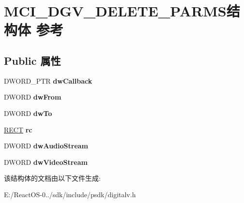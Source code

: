 \hypertarget{struct_m_c_i___d_g_v___d_e_l_e_t_e___p_a_r_m_s}{}\section{M\+C\+I\+\_\+\+D\+G\+V\+\_\+\+D\+E\+L\+E\+T\+E\+\_\+\+P\+A\+R\+M\+S结构体 参考}
\label{struct_m_c_i___d_g_v___d_e_l_e_t_e___p_a_r_m_s}
\subsection*{Public 属性}
\begin{DoxyCompactItemize}
\item 
\mbox{\label{struct_m_c_i___d_g_v___d_e_l_e_t_e___p_a_r_m_s_a3f08d20ea19a0c601505636c8ce9ef38}} 
D\+W\+O\+R\+D\+\_\+\+P\+TR {\bfseries dw\+Callback}
\item 
\mbox{\label{struct_m_c_i___d_g_v___d_e_l_e_t_e___p_a_r_m_s_a28b40a05c4c8c87f0035c87f5d67fc40}} 
D\+W\+O\+RD {\bfseries dw\+From}
\item 
\mbox{\label{struct_m_c_i___d_g_v___d_e_l_e_t_e___p_a_r_m_s_afd8b0897dedf6e36043d8112009fc9ce}} 
D\+W\+O\+RD {\bfseries dw\+To}
\item 
\mbox{\label{struct_m_c_i___d_g_v___d_e_l_e_t_e___p_a_r_m_s_a9edaf53cf5c19d4d1438baf17c58153d}} 
\hyperlink{structtag_r_e_c_t}{R\+E\+CT} {\bfseries rc}
\item 
\mbox{\label{struct_m_c_i___d_g_v___d_e_l_e_t_e___p_a_r_m_s_a98b0a12334a1b9d4eab3d47a8ee0f74d}} 
D\+W\+O\+RD {\bfseries dw\+Audio\+Stream}
\item 
\mbox{\label{struct_m_c_i___d_g_v___d_e_l_e_t_e___p_a_r_m_s_aaa9e86b9fc4947678d01345ae057cb1d}} 
D\+W\+O\+RD {\bfseries dw\+Video\+Stream}
\end{DoxyCompactItemize}


该结构体的文档由以下文件生成\+:\begin{DoxyCompactItemize}
\item 
E\+:/\+React\+O\+S-\/0../sdk/include/psdk/digitalv.\+h\end{DoxyCompactItemize}
